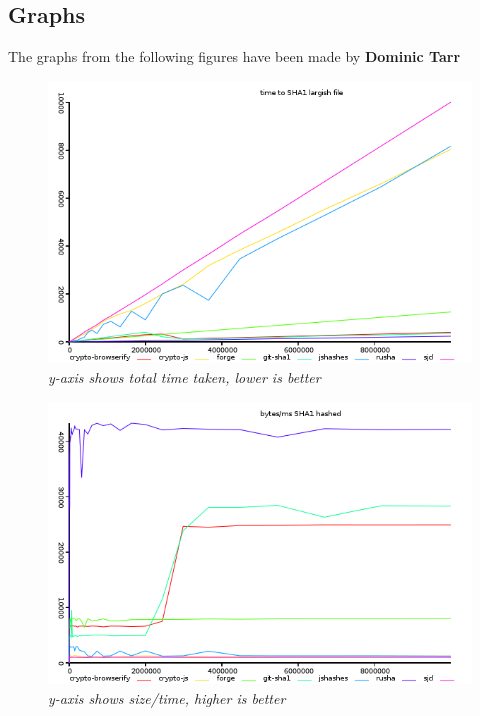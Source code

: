 
\subsection{Graphs}
The graphs from the following figures have been made by \textbf{Dominic Tarr} \cite {Tarr2014PerformanceLibraries.}

\begin{figure}[htpb]
\centering
\caption{\small \sl y-axis shows total time taken, lower is better
\label{fig:hash-sha1}}  
\includegraphics[scale=0.6]{graphs/hash-sha1.png}
\end{figure}

\begin{figure}[htpb]
\centering
\caption{\small \sl y-axis shows size/time, higher is better
\label{fig:hash-ops-sha1}}
\includegraphics[scale=0.6]{graphs/hash-ops-sha1.png}
\end{figure}

